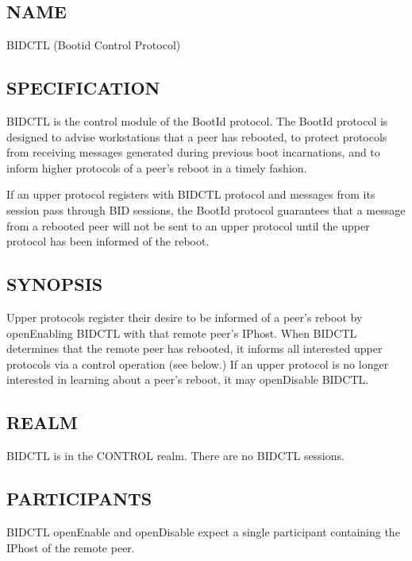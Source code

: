 %
%
%

\subsection*{NAME}

\noindent BIDCTL (Bootid Control Protocol)

\subsection*{SPECIFICATION}

BIDCTL is the control module of the BootId protocol. 
The BootId protocol is designed to advise workstations that a peer has
rebooted, to protect protocols from receiving messages generated
during previous boot incarnations, and to inform higher protocols of a
peer's reboot in a timely fashion.

If an upper protocol registers with BIDCTL protocol and messages
from its session pass through BID sessions, the BootId protocol
guarantees that a message from a rebooted peer will not be sent to an
upper protocol until the upper protocol has been informed of the
reboot.  

\subsection*{SYNOPSIS}

\noindent 
Upper protocols register their desire to be informed of a peer's
reboot by openEnabling BIDCTL with that remote peer's IPhost.  When
BIDCTL determines that the remote peer has rebooted, it informs all
interested upper protocols via a control operation (see below.) If an
upper protocol is no longer interested in learning about a peer's
reboot, it may openDisable BIDCTL.

\subsection*{REALM}

BIDCTL is in the CONTROL realm.  There are no BIDCTL sessions.

\subsection*{PARTICIPANTS}

BIDCTL openEnable and openDisable expect a single participant
containing the IPhost of the remote peer.

